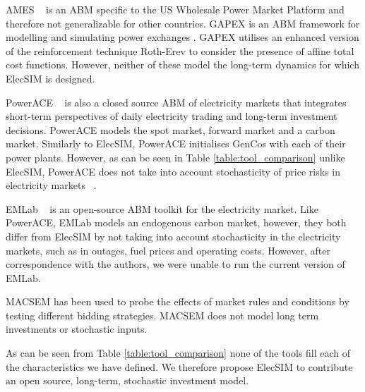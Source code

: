 AMES ~\cite{Sun2007} is an ABM specific to the US Wholesale Power Market Platform and therefore not generalizable for other countries. GAPEX \cite{Cincotti2013} is an ABM framework for modelling and simulating power exchanges . GAPEX utilises an enhanced version of the reinforcement technique Roth-Erev \cite{RothAE1995} to consider the presence of affine total cost functions. However, neither of these model the long-term dynamics for which ElecSIM is designed.



PowerACE ~\cite{Rothengatter2007} is also a closed source ABM of electricity markets that integrates short-term perspectives of daily electricity trading and long-term investment decisions. PowerACE models the spot market, forward market and a carbon market. Similarly to ElecSIM, PowerACE initialises GenCos with each of their power plants. However, as can be seen in Table \ref{table:tool_comparison} unlike ElecSIM, PowerACE does not take into account stochasticity of price risks in electricity markets ~\cite{Most2010}.

EMLab ~\cite{Chappin2017} is an open-source ABM toolkit for the electricity market. Like PowerACE, EMLab models an endogenous carbon market, however, they both differ from ElecSIM by not taking into account stochasticity in the electricity markets, such as in outages, fuel prices and operating costs. However, after correspondence with the authors, we were unable to run the current version of EMLab.

MACSEM \cite{Praca2003} has been used to probe the effects of market rules and conditions by testing different bidding strategies. MACSEM does not model long term investments or stochastic inputs.


As can be seen from Table \ref{table:tool_comparison} none of the tools fill each of the characteristics we have defined. We therefore propose ElecSIM to contribute an open source, long-term, stochastic investment model. 


